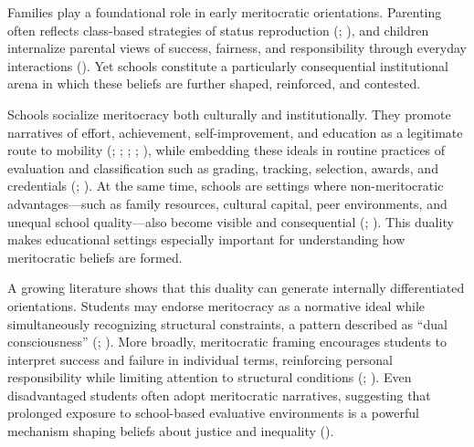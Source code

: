 \documentclass[
  13pt,
]{article}
\begin{document}
Families play a foundational role in early meritocratic orientations.
Parenting often reflects class-based strategies of status reproduction
(;
),
and children internalize parental views of success, fairness, and
responsibility through everyday interactions
(). Yet schools
constitute a particularly consequential institutional arena in which
these beliefs are further shaped, reinforced, and contested.

Schools socialize meritocracy both culturally and institutionally. They
promote narratives of effort, achievement, self-improvement, and
education as a legitimate route to mobility
(;
;
;
;
), while
embedding these ideals in routine practices of evaluation and
classification such as grading, tracking, selection, awards, and
credentials (;
). At the same
time, schools are settings where non-meritocratic advantages---such as
family resources, cultural capital, peer environments, and unequal
school quality---also become visible and consequential
(;
). This duality
makes educational settings especially important for understanding how
meritocratic beliefs are formed.

A growing literature shows that this duality can generate internally
differentiated orientations. Students may endorse meritocracy as a
normative ideal while simultaneously recognizing structural constraints,
a pattern described as ``dual consciousness''
(;
). More broadly,
meritocratic framing encourages students to interpret success and
failure in individual terms, reinforcing personal responsibility while
limiting attention to structural conditions
(;
). Even
disadvantaged students often adopt meritocratic narratives, suggesting
that prolonged exposure to school-based evaluative environments is a
powerful mechanism shaping beliefs about justice and inequality
().
\end{document}
